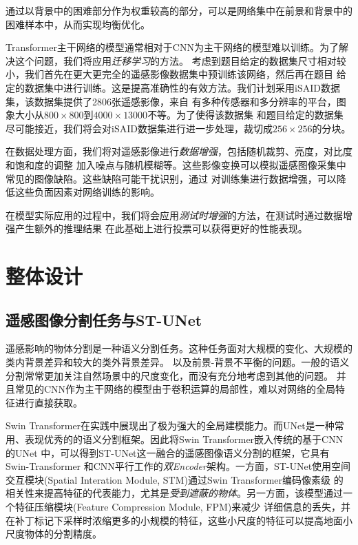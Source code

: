 \documentclass[a4paper,twoside,zihao=5,UTF8]{ctexrep}
\begin{document}
通过以背景中的困难部分作为权重较高的部分，可以是网络集中在前景和背景中的困难样本中，从而实现均衡优化。

Transformer主干网络的模型通常相对于CNN为主干网络的模型难以训练。为了解决这个问题，我们将应用\emph{迁移学习}的方法。
考虑到题目给定的数据集尺寸相对较小，我们首先在更大更完全的遥感影像数据集中预训练该网络，然后再在题目
给定的数据集中进行训练。这是提高准确性的有效方法。我们计划采用iSAID数据集\cite{isaid}，该数据集提供了2806张遥感影像，来自
有多种传感器和多分辨率的平台，图象大小从$800\times800$到$4000\times13000$不等。为了使得该数据集
和题目给定的数据集尽可能接近，我们将会对iSAID数据集进行进一步处理，裁切成$256\times256$的分块。

在数据处理方面，我们将对遥感影像进行\emph{数据增强}，包括随机裁剪、亮度，对比度和饱和度的调整
加入噪点与随机模糊等。这些影像变换可以模拟遥感图像采集中常见的图像缺陷。这些缺陷可能干扰识别，通过
对训练集进行数据增强，可以降低这些负面因素对网络训练的影响。

在模型实际应用的过程中，我们将会应用\emph{测试时增强}的方法，在测试时通过数据增强产生额外的推理结果
在此基础上进行投票可以获得更好的性能表现。


\chapter{整体设计}

\section{遥感图像分割任务与ST-UNet}
遥感影响的物体分割是一种语义分割任务。这种任务面对大规模的变化、大规模的类内背景差异和较大的类外背景差异。
以及前景-背景不平衡的问题。一般的语义分割常常更加关注自然场景中的尺度变化，而没有充分地考虑到其他的问题\cite{farseg}。
并且常见的CNN作为主干网络的模型由于卷积运算的局部性，难以对网络的全局特征进行直接获取。

Swin Transformer在实践中展现出了极为强大的全局建模能力。而UNet是一种常用、表现优秀的的语义分割框架。因此将Swin Transformer嵌入传统的基于CNN的UNet
中，可以得到ST-UNet这一融合的遥感图像语义分割的框架\cite{stunet}，它具有Swin-Transformer
和CNN平行工作的\emph{双Encoder}架构。一方面，ST-UNet使用空间交互模块(Spatial Interation Module, STM)通过Swin Transformer编码像素级
的相关性来提高特征的代表能力，尤其是\emph{受到遮蔽的物体}。另一方面，该模型通过一个特征压缩模块(Feature Compression Module, FPM)来减少
详细信息的丢失，并在补丁标记下采样时浓缩更多的小规模的特征，这些小尺度的特征可以提高地面小尺度物体的分割精度。
\end{document}
